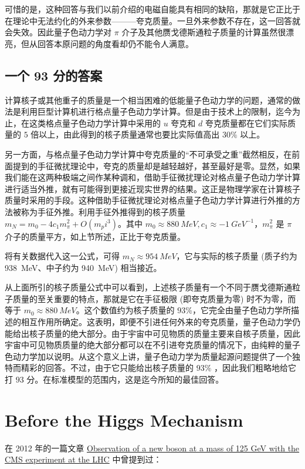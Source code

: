 \documentclass[oneside,a4paper,openany,11pt]{ctexbook}
\begin{document}
可惜的是，这种回答与我们以前介绍的电磁自能具有相同的缺陷，那就是它正比于在理论中无法约化的外来参数———夸克质量。一旦外来参数不存在，这一回答就会失效。因此量子色动力学对 $\pi$ 介子及其他赝戈德斯通粒子质量的计算虽然很漂亮，但从回答本原问题的角度看却仍不能令人满意。

\section{一个 93 分的答案}

计算核子或其他重子的质量是一个相当困难的低能量子色动力学的问题，通常的做法是利用巨型计算机进行格点量子色动力学计算。但是由于技术上的限制，迄今为止，在这类格点量子色动力学计算中采用的 $u$ 夸克和 $d$ 夸克质量都在它们实际质量的 $5$ 倍以上，由此得到的核子质量通常也要比实际值高出 $30\%$ 以上。

另一方面，与格点量子色动力学计算中夸克质量的“不可承受之重”截然相反，在前面提到的手征微扰理论中，夸克的质量却是越轻越好，甚至最好是零。显然，如果我们能在这两种极端之间作某种调和，借助手征微扰理论对格点量子色动力学计算进行适当外推，就有可能得到更接近现实世界的结果。这正是物理学家在计算核子质量时采用的手段。这种借助手征微扰理论对格点量子色动力学计算进行外推的方法被称为手征外推。利用手征外推得到的核子质量 $m_N=m_0-4 c_1 m_\pi^2 + O(m_pi^3)$。其中 $m_0 \approx \qty{880}{MeV}, c_1 \approx-\qty{1}{GeV^{-1}}$，$m^2_\pi$ 是 $\pi$ 介子的质量平方，如上节所述，正比于夸克质量。

将有关数据代入这一公式，可得 $m_N\approx\qty{954}{MeV}$，它与实际的核子质量 (质子约为 \qty{938}{MeV}、中子约为 \qty{940}{MeV}) 相当接近。

从上面所引的核子质量公式中可以看到，上述核子质量有一个不同于赝戈德斯通粒子质量的至关重要的特点，那就是它在手征极限 (即夸克质量为零) 时不为零，而等于 $m_0 \approx\qty{880}{MeV}$。这个数值约为核子质量的 $93\%$，它完全由量子色动力学所描述的相互作用所确定。这表明，即便不引进任何外来的夸克质量，量子色动力学仍能给出核子质量的绝大部分。由于宇宙中可见物质的质量主要来自核子质量，因此宇宙中可见物质质量的绝大部分都可以在不引进夸克质量的情况下，由纯粹的量子色动力学加以说明。从这个意义上讲，量子色动力学为质量起源问题提供了一个独特而精彩的回答。不过，由于它只能给出核子质量的 $93\%$ ，因此我们粗略地给它打 $93$ 分。在标准模型的范围内，这是迄今所知的最佳回答。

\chapter{Before the Higgs Mechanism}

在 2012 年的一篇文章 \href{https://inspirehep.net/literature/1124338}{Observation of a new boson at a mass of 125 GeV with the CMS experiment at the LHC} 中曾提到过：
\end{document}
